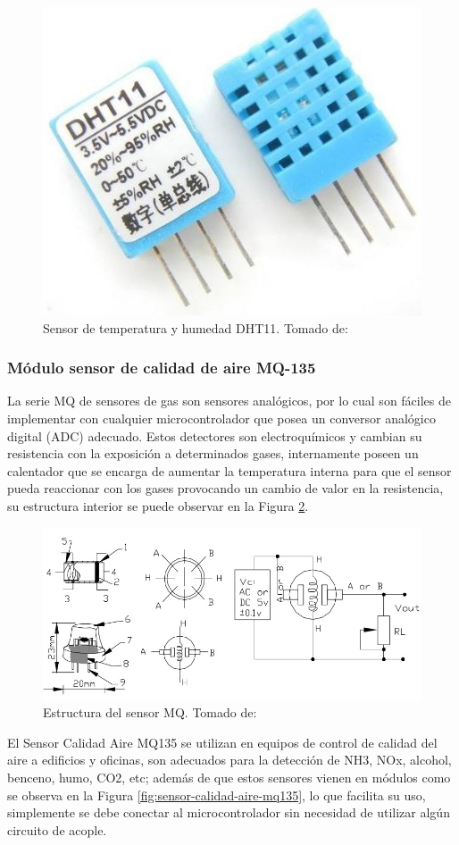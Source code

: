 \begin{figure}[H]
	\centering
	\caption{Sensor de temperatura y humedad DHT11. Tomado de: \cite{DHT11}}
	\label{fig:dht11}
	\includegraphics[width=0.4\linewidth]{Imagenes/dht11}
\end{figure}


\subsubsection{Módulo sensor de calidad de aire MQ-135}

La serie MQ de sensores de gas son sensores analógicos, por lo cual son fáciles de implementar con cualquier microcontrolador que posea un conversor analógico digital (ADC) adecuado. Estos detectores son electroquímicos y cambian su resistencia con la exposición a determinados gases, internamente poseen un calentador que se encarga de aumentar la temperatura interna para que el sensor pueda reaccionar con los gases provocando un cambio de valor en la resistencia, su estructura interior se puede observar en la Figura \ref{fig:estructura-del-sensor-mq}.\cite{MQ1}

\begin{figure}[H]
	\centering
	\caption{Estructura del sensor MQ. Tomado de: \cite{MQ1}}
	\label{fig:estructura-del-sensor-mq}
	\includegraphics[width=0.7\linewidth]{Imagenes/Estructura_del_sensor_MQ}
\end{figure}

El Sensor Calidad Aire MQ135 se utilizan en equipos de control de calidad del aire a edificios y oficinas, son adecuados para la detección de NH3, NOx, alcohol, benceno, humo, CO2, etc; además de que estos sensores vienen en módulos como se observa en la Figura \ref{fig:sensor-calidad-aire-mq135}, lo que facilita su uso, simplemente se debe conectar al microcontrolador sin necesidad de utilizar algún circuito de acople. \cite{MQ1}

